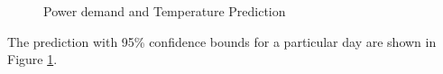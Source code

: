 \begin{figure}
	\caption{Power demand and Temperature Prediction}
	\label{F:prediction}
\end{figure}
The prediction with 95\% confidence bounds for a particular day are shown in Figure \ref{F:prediction}.

